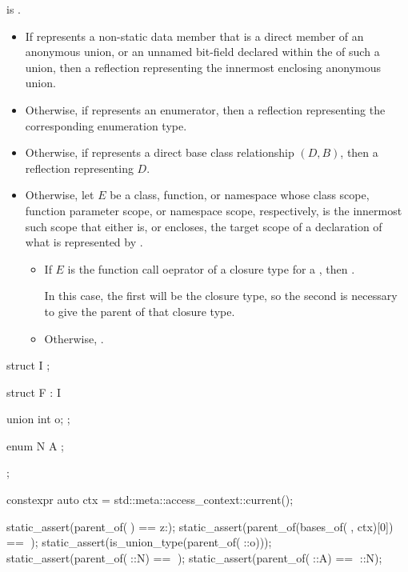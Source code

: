 \begin{itemdescr}
\pnum
\constantwhen
{} is .

\pnum
\returns
\begin{itemize}
\item
  If  represents a non-static data member
  that is a direct member of an anonymous union,
  or an unnamed bit-field declared
  within the  of such a union,
  then a reflection representing the innermost enclosing anonymous union.
\item
  Otherwise, if  represents an enumerator,
  then a reflection representing the corresponding enumeration type.
\item
  Otherwise, if  represents a direct base class relationship $(D, B)$,
  then a reflection representing $D$.
\item
  Otherwise, let $E$ be a class, function, or namespace
  whose class scope, function parameter scope, or namespace scope, respectively,
  is the innermost such scope that either is, or encloses,
  the target scope of a declaration of what is represented by .
  \begin{itemize}
  \item
    If $E$ is the function call oeprator of a closure type
    for a ,
    then .
    \begin{note}
    In this case,
    the first  will be the closure type,
    so the second  is necessary
    to give the parent of that closure type.
    \end{note}
  \item
    Otherwise, .
  \end{itemize}
\end{itemize}
\begin{example}
\begin{codeblock}
struct I { };

struct F : I {
  union {
    int o;
  };

  enum N {
    A
  };
};

constexpr auto ctx = std::meta::access_context::current();

static_assert(parent_of(^^F) == ^^::);
static_assert(parent_of(bases_of(^^F, ctx)[0]) == ^^F);
static_assert(is_union_type(parent_of(^^F::o)));
static_assert(parent_of(^^F::N) == ^^F);
static_assert(parent_of(^^F::A) == ^^F::N);
\end{codeblock}
\end{example}
\end{itemdescr}

